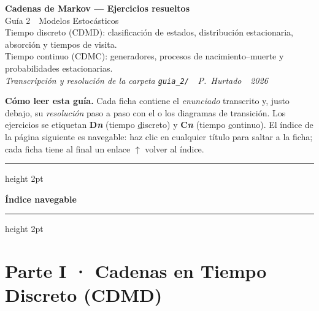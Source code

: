\documentclass[11pt,a4paper]{article}
\begin{document}

\begin{tcolorbox}[
    enhanced, colback=primary, colframe=primdark, colupper=white,
    sharp corners, boxrule=1pt, left=14pt, right=14pt, top=12pt, bottom=12pt,
    borderline west={4pt}{0pt}{accent},
  ]
  {\LARGE\bfseries\sffamily Cadenas de Markov — Ejercicios resueltos}\\[5pt]
  {\normalsize\sffamily Guía 2 \,\textbullet\, Modelos Estocásticos}\\[7pt]
  {\small\sffamily\color{white!85!primary}
    Tiempo discreto (CDMD): clasificación de estados, distribución estacionaria,
    absorción y tiempos de visita. \\
    Tiempo continuo (CDMC): generadores, procesos de nacimiento--muerte y
    probabilidades estacionarias.}\\[7pt]
  {\footnotesize\sffamily\color{white!85!primary}\itshape
    Transcripción y resolución de la carpeta \texttt{guia\_2/} \,\textbullet\, P.~Hurtado \,\textbullet\, 2026}
\end{tcolorbox}

\vspace{4pt}

\begin{nota}
\textbf{Cómo leer esta guía.} Cada ficha contiene el \emph{enunciado} transcrito y, justo
debajo, su \emph{resolución} paso a paso con el o los diagramas de transición. Los
ejercicios se etiquetan \textbf{D\textit{n}} (tiempo \underline{d}iscreto) y \textbf{C\textit{n}}
(tiempo \underline{c}ontinuo). El índice de la página siguiente es navegable: haz clic en
cualquier título para saltar a la ficha; cada ficha tiene al final un enlace
\textsf{$\uparrow$ volver al índice}.
\end{nota}

\clearpage
\hypertarget{indice}{}
{\color{primary}\hrule height 2pt}
\vspace{4pt}
{\Large\bfseries\sffamily\color{primary} Índice navegable}
\vspace{2pt}
{\color{accent}\hrule height 2pt}
\vspace{8pt}
\tableofcontents
\clearpage

\section{Parte I · Cadenas en Tiempo Discreto (CDMD)}
\end{document}

